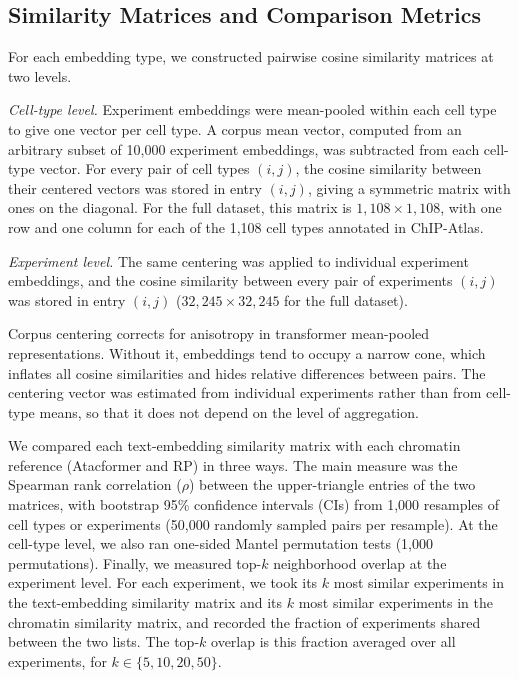 \documentclass[12pt]{article}
\begin{document}
\subsection{Similarity Matrices and Comparison Metrics}
\label{sec:metrics}

For each embedding type, we constructed pairwise cosine similarity matrices at
two levels.

\textit{Cell-type level.} Experiment embeddings were mean-pooled within each
cell type to give one vector per cell type. A corpus mean vector, computed from
an arbitrary subset of 10,000 experiment embeddings, was subtracted from each
cell-type vector. For every pair of cell types $(i, j)$, the cosine similarity
between their centered vectors was stored in entry $(i, j)$, giving a
symmetric matrix with ones on the diagonal. For the full dataset, this matrix
is $1{,}108 \times 1{,}108$, with one row and one column for each of the 1,108
cell types annotated in ChIP-Atlas.

\textit{Experiment level.} The same centering was applied to individual
experiment embeddings, and the cosine similarity between every pair of
experiments $(i, j)$ was stored in entry $(i, j)$
($32{,}245 \times 32{,}245$ for the full dataset).

Corpus centering corrects for anisotropy in transformer mean-pooled
representations. Without it, embeddings tend to occupy a narrow cone, which
inflates all cosine similarities and hides relative differences between
pairs. The centering vector was estimated from individual experiments rather
than from cell-type means, so that it does not depend on the level of
aggregation.

We compared each text-embedding similarity matrix with each chromatin
reference (Atacformer and RP) in three ways. The main measure was the
Spearman rank correlation ($\rho$) between the upper-triangle entries of the
two matrices, with bootstrap 95\% confidence intervals (CIs) from 1,000
resamples of cell types or experiments (50,000 randomly sampled pairs per
resample). At the cell-type level, we also ran one-sided Mantel permutation
tests (1,000 permutations). Finally, we measured top-$k$ neighborhood overlap
at the experiment level. For each experiment, we took its $k$ most similar
experiments in the text-embedding similarity matrix and its $k$ most similar
experiments in the chromatin similarity matrix, and recorded the fraction of
experiments shared between the two lists. The top-$k$ overlap is this fraction
averaged over all experiments, for $k \in \{5, 10, 20, 50\}$.
\end{document}
